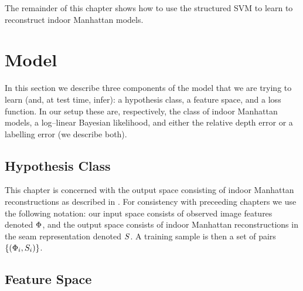The remainder of this chapter shows how to use the structured SVM to
learn to reconstruct indoor Manhattan models.

\section{Model}
\label{sec:model}

In this section we describe three components of the model that we are
trying to learn (and, at test time, infer): a hypothesis class, a
feature space, and a loss function. In our setup these are,
respectively, the class of indoor Manhattan models, a log--linear
Bayesian likelihood, and either the relative depth error or a
labelling error (we describe both).

\subsection{Hypothesis Class}

This chapter is concerned with the output space consisting of indoor
Manhattan reconstructions as described in . For
consistency with preceeding chapters we use the following notation:
our input space consists of observed image features denoted
$\Features$, and the output space consists of indoor Manhattan
reconstructions in the seam representation denoted $\Seam$. A training
sample is then a set of pairs $\{(\Features_i,\Seam_i)\}$.

\subsection{Feature Space}

